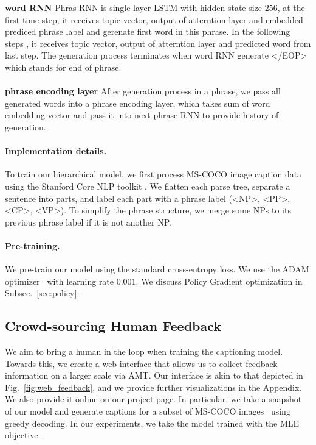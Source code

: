 \textbf{word RNN } Phras RNN is single layer LSTM with hidden state size 256, at the first time step, it receives topic vector, output of atterntion layer and embedded prediced phrase label and gerenate first word in this phrase. In the following steps , it receives topic vector, output of atterntion layer and predicted word from last step. The generation process terminates when word RNN generate </EOP> which stands for end of phrase.\\\\

\textbf{phrase encoding layer } After generation process in a phrase, we pass all generated words into a phrase encoding layer, which takes sum of word embedding vector and pass it into next phrase RNN to provide history of generation.\\
\fi

\vspace{-3mm}
\paragraph{Implementation details. }
To train our hierarchical model, we first process MS-COCO image caption data~\cite{lin2014microsoft} using the Stanford Core NLP toolkit \cite{stanfordCore}. We flatten each parse tree, separate a sentence into parts, and label each part with a phrase label (<NP>, <PP>, <CP>, <VP>). To simplify the phrase structure, we merge some NPs to its previous phrase label if it is not another NP.  %

\vspace{-3mm}
\paragraph{Pre-training.} We pre-train our model using the standard cross-entropy loss.  We use the ADAM optimizer~\cite{kingma2014adam} with learning rate $0.001$. We discuss Policy Gradient optimization in Subsec.~\ref{sec:policy}. 



\vspace{-1mm}
\subsection{Crowd-sourcing Human Feedback}
\label{sec:feedback}

We aim to bring a human in the loop when training the captioning model. Towards this, we create a web interface that allows us to collect feedback information on a larger scale via AMT. Our interface is akin to that depicted in Fig.~\ref{fig:web_feedback}, and we provide further visualizations in the Appendix. We also provide it online on our project page. In particular, we take a snapshot of our model and generate captions for a subset of MS-COCO images~\cite{lin2014microsoft} using greedy decoding. In our experiments, we take the model trained with the MLE objective. 

